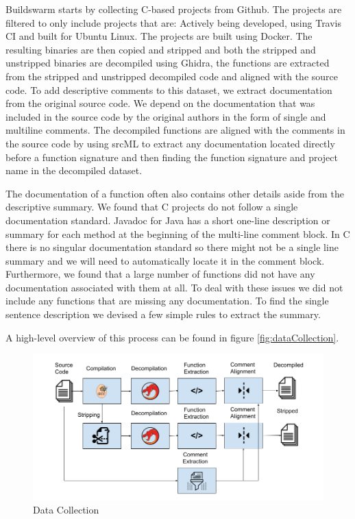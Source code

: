 Buildswarm starts by collecting C-based projects from Github. The projects are filtered to only include projects that are: Actively being developed, using Travis CI and built for Ubuntu Linux. The projects are built using Docker. The resulting binaries are then copied and stripped and both the stripped and unstripped binaries are decompiled using Ghidra, the functions are extracted from the stripped and unstripped decompiled code and aligned with the source code. 
To add descriptive comments to this dataset, we extract documentation from the original source code. We depend on the documentation that was included in the source code by the original authors in the form of single and multiline comments. The decompiled functions are aligned with the comments in the source code by using srcML to extract any documentation located directly before a function signature and then finding the function signature and project name in the decompiled dataset.

The documentation of a function often also contains other details aside from the descriptive summary. We found that C projects do not follow a single documentation standard. Javadoc for Java has a short one-line description or summary for each method at the beginning of the multi-line comment block. In C there is no singular documentation standard so there might not be a single line summary and we will need to automatically locate it in the comment block. 
Furthermore, we found that a large number of functions did not have any documentation associated with them at all. To deal with these issues we did not include any functions that are missing any documentation. To find the single sentence description we devised a few simple rules to extract the summary.

A high-level overview of this process can be found in figure \ref{fig:dataCollection}.

\label{fig:dataCollection}
\begin{figure}[!h]
  \centering
  \includegraphics[width=\linewidth]{img/dataCollection.png}
  \caption{Data Collection}
\end{figure}

